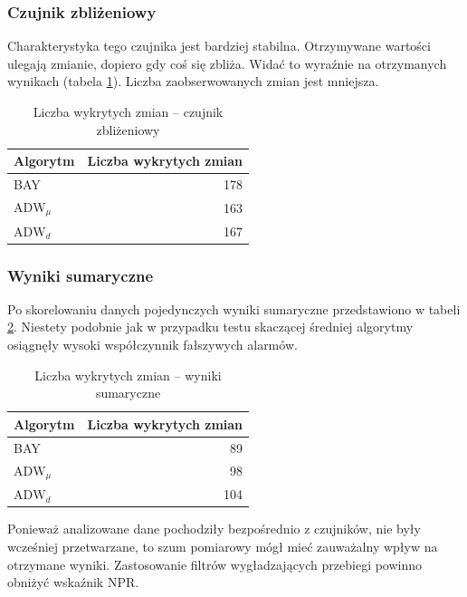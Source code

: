 \subsubsection*{Czujnik zbliżeniowy}
Charakterystyka tego czujnika jest bardziej stabilna.
Otrzymywane wartości ulegają zmianie, dopiero gdy coś się zbliża.
Widać to wyraźnie na otrzymanych wynikach (tabela \ref{tab:DistResutl}).
Liczba zaobserwowanych zmian jest mniejsza.
\begin{table}[h]
  \label{tab:DistResutl}
  \centering
  \begin{tabular}{l r }
    Algorytm & \multicolumn{1}{l}{Liczba wykrytych zmian} \\
    \hline
    BAY & 178 \\
    $\mbox{ADW}_{\mu}$ & 163 \\
    $\mbox{ADW}_{d}$ & 167\\
  \end{tabular}
  \caption{Liczba wykrytych zmian -- czujnik zbliżeniowy}
\end{table}

\subsubsection*{Wyniki sumaryczne}
Po skorelowaniu danych pojedynczych wyniki sumaryczne przedstawiono w tabeli \ref{tab:DevAllResutl}.
Niestety podobnie jak w przypadku testu skaczącej średniej algorytmy osiągnęły wysoki współczynnik fałszywych alarmów.
\begin{table}[h]
  \label{tab:DevAllResutl}
  \centering
  \begin{tabular}{l r}
    Algorytm & \multicolumn{1}{l}{Liczba wykrytych zmian} \\
    \hline
    BAY & 89 \\
    $\mbox{ADW}_{\mu}$ & 98 \\
    $\mbox{ADW}_{d}$ & 104 \\
  \end{tabular}
  \caption{Liczba wykrytych zmian -- wyniki sumaryczne}
\end{table}
Ponieważ analizowane dane pochodziły bezpośrednio z czujników,
nie były wcześniej przetwarzane,
to szum pomiarowy mógł mieć zauważalny wpływ na otrzymane wyniki.
Zastosowanie filtrów wygładzających przebiegi powinno obniżyć wskaźnik NPR.
